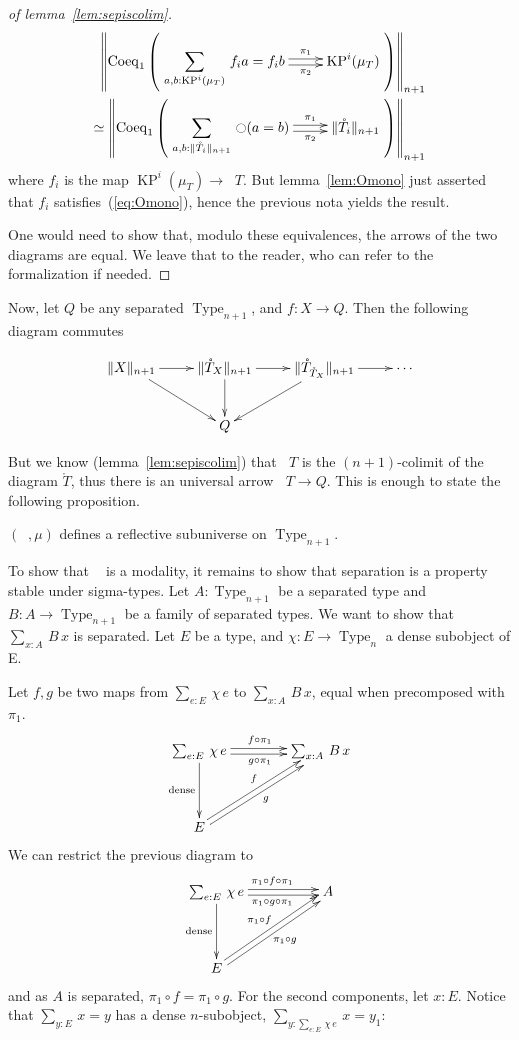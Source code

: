 \documentclass[notfinal]{jfrarticle}
\DeclareMathOperator{\Type}{Type}
\newcommand{\modal}{\ensuremath{\ocircle}}
\newcommand \separated {\mathop{\square_{n+1}} }
\newcommand{\sumD}[3]{\sum_{#1:#2}\, #3}
\newcommand{\code}[1]{\texttt{#1}}
\DeclareMathOperator{\KP}{KP}
\begin{document}
\begin{proof}[of lemma~\ref{lem:sepiscolim}]
  \[
    \begin{split}
    \left\|\mathrm{Coeq}_1 \left( 
      \xymatrix{
        \displaystyle{\sumD {a,b}{\KP^i(\mu_T)} {f_{i} a = f_{i} b}} \ar@<-.5ex>[r]_-{\pi_2} \ar@<.5ex>[r]^-{\pi_1} & \KP^i(\mu_T)
      }
    \right)\right\|_{n+1}
    \\ \simeq 
    \left\|\mathrm{Coeq}_1 \left( 
      \xymatrix{\displaystyle{\sumD {a,b} {\|\mathring T_i\|_{n+1}} {\modal (a=b)}} \ar@<-.5ex>[r]_-{\pi_2} \ar@<.5ex>[r]^-{\pi_1} & \|\mathring T_i\|_{n+1}}
    \right)\right\|_{n+1}
    \end{split}
  \]
  where $f_{i}$ is the map $\KP^i(\mu_T) \to \separated T$. But
  lemma~\ref{lem:Omono} just asserted that $f_i$
  satisfies~(\ref{eq:Omono}), hence the previous nota yields the result.
  
  One would need to show that, modulo these equivalences, the arrows
  of the two diagrams are equal. We leave that to the reader, who can
  refer to the formalization if needed.
\end{proof}

Now, let $Q$ be any separated $\Type_{n+1}$, and $f:X \to Q$. Then the
following diagram commutes

\[\xymatrix{
\|X\|_{n+1} \ar[r] \ar[rd] & \|\mathring T_{X}\|_{n+1} \ar[r] \ar[d] & \|\mathring
  T_{\mathring T_X} \|_{n+1} \ar[ld] \ar[r] & \cdots \\
  & Q &&
} \]%

But we know (lemma~\ref{lem:sepiscolim}) that $\separated T$ is the
$(n+1)$-colimit of the diagram $\mathring T$, thus there is an universal
arrow $\separated T \to Q$.
%
This is enough to state the following proposition.
\begin{prop}[\thethm\ (\code{separation\_reflective\_subuniverse})]
\label{prop:sep-subu}
  $(\separated,\mu)$ defines a reflective subuniverse on $\Type_{n+1}$.
\end{prop}

To show that $\separated$ is a modality, it remains to show that
separation is a property stable under sigma-types.
%
Let $A:\Type_{n+1}$ be a separated type and $B:A \to \Type_{n+1}$ be a
family of separated types. We want to show that $\sumD x A {B\, x}$ is separated. Let $E$
be a type, and $\chi:E\to\Type_n$ a dense subobject of E.

Let $f,g$ be two maps from $\sumD e E {\chi\,e}$ to $\sumD x A
{B\, x}$, equal when precomposed with $\pi_1$.
\[\xymatrix @R=4em @C=4em{
  \sumD e E {\chi\, e} \ar@<-2pt>[r]_{g\circ\pi_1}
  \ar@<2pt>[r]^{f\circ \pi_1} \ar[d]_{\mathrm{dense}}& \sumD x A {B\, x} \\
  E \ar@<-2pt>[ru]_{g} \ar@<2pt>[ru]^{f}&
}\]%
We can restrict the previous diagram to 
\[\xymatrix @R=4em @C=5em{
  \sumD e E {\chi\, e} \ar@<-2pt>[r]_{\pi_1\circ g\circ\pi_1} \ar@<2pt>[r]^{\pi_1\circ f\circ \pi_1} \ar[d]_{\mathrm{dense}}& A \\
  E \ar@<-2pt>[ru]_{\pi_1\circ g} \ar@<2pt>[ru]^{\pi_1\circ f}&
}\]%
and as $A$ is separated, $\pi_1\circ f = \pi_1 \circ g$.
For the second components, let $x:E$. Notice that 
$\sumD y E {x = y}$ has a dense $n$-subobject, $\sumD y {\sumD e E {\chi\,
  e}} {x=y_1}$:
\end{document}
